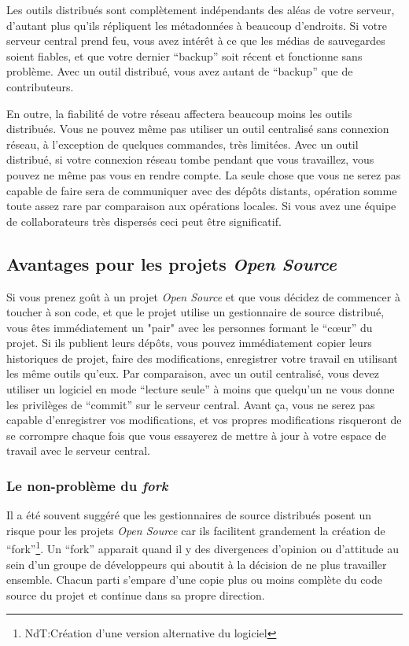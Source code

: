 Les outils distribués sont complètement indépendants des aléas de votre serveur,
d'autant plus qu'ils répliquent les métadonnées à beaucoup d'endroits. Si
votre serveur central prend feu, vous avez intérêt à ce que les médias de 
sauvegardes soient fiables, et que votre dernier ``backup'' soit récent et
fonctionne sans problème. Avec un outil distribué, vous avez autant de 
``backup'' que de contributeurs.

En outre, la fiabilité de votre réseau affectera beaucoup moins les
outils distribués. Vous ne pouvez même pas utiliser un outil centralisé
sans connexion réseau, à l'exception de quelques commandes, très limitées. 
Avec un outil distribué, si votre connexion réseau tombe pendant que vous
travaillez, vous pouvez ne même pas vous en rendre compte. La seule chose
que vous ne serez pas capable de faire sera de communiquer avec des dépôts
distants, opération somme toute assez rare par comparaison aux opérations
locales. Si vous avez une équipe de collaborateurs très dispersés ceci peut
être significatif.

\subsection{Avantages pour les projets \textit{Open Source}}

Si vous prenez goût à un projet \textit{Open Source} et que vous
décidez de commencer à toucher à son code, et que le projet utilise
un gestionnaire de source distribué, vous êtes immédiatement un "pair"
avec les personnes formant le ``cœur'' du projet. Si ils publient
leurs dépôts, vous pouvez immédiatement copier leurs historiques de
projet, faire des modifications, enregistrer votre travail en utilisant
les même outils qu'eux. Par comparaison, avec un outil centralisé, vous
devez utiliser un logiciel en mode ``lecture seule'' à moins que 
quelqu'un ne vous donne les privilèges de ``commit'' sur le serveur
central. Avant ça, vous ne serez pas capable d'enregistrer vos 
modifications, et vos propres modifications risqueront de se 
corrompre chaque fois que vous essayerez de mettre à jour à votre
espace de travail avec le serveur central.

\subsubsection{Le non-problème du \textit{fork}}

Il a été souvent suggéré que les gestionnaires de source distribués
posent un risque pour les projets \textit{Open Source} car ils 
facilitent grandement la création de ``fork''\footnote{NdT:Création 
d'une version alternative du logiciel}. %
Un ``fork'' apparait quand il y des divergences d'opinion ou d'attitude
au sein d'un groupe de développeurs qui aboutit à la décision de ne 
plus travailler ensemble. Chacun parti s'empare d'une copie plus ou moins
complète du code source du projet et continue dans sa propre direction.

